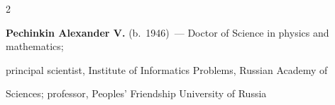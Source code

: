 \begin{multicols}{2}








\noindent


\textbf{Pechinkin Alexander V.} (b.\ 1946)~--- Doctor of Science in physics and mathematics;


principal scientist, Institute of Informatics Problems, Russian Academy of


Sciences; professor, Peoples' Friendship University of Russia





























































\end{multicols}
